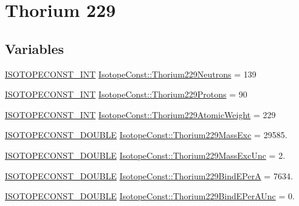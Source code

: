 \hypertarget{group___isotope_const-_thorium-_th229}{}\section{Thorium 229}
\label{group___isotope_const-_thorium-_th229}
\subsection*{Variables}
\begin{DoxyCompactItemize}
\item 
\mbox{\hyperlink{group___isotope_const-_macros_ga5f18360b3e99483a35c32d789e62621c}{I\+S\+O\+T\+O\+P\+E\+C\+O\+N\+S\+T\+\_\+\+I\+NT}} \mbox{\hyperlink{group___isotope_const-_thorium-_th229_ga28608a72c86e6ce0e16561b280726914}{Isotope\+Const\+::\+Thorium229\+Neutrons}} = 139
\item 
\mbox{\hyperlink{group___isotope_const-_macros_ga5f18360b3e99483a35c32d789e62621c}{I\+S\+O\+T\+O\+P\+E\+C\+O\+N\+S\+T\+\_\+\+I\+NT}} \mbox{\hyperlink{group___isotope_const-_thorium-_th229_gaa3caf9fdee3622fb33305113cd5ff133}{Isotope\+Const\+::\+Thorium229\+Protons}} = 90
\item 
\mbox{\hyperlink{group___isotope_const-_macros_ga5f18360b3e99483a35c32d789e62621c}{I\+S\+O\+T\+O\+P\+E\+C\+O\+N\+S\+T\+\_\+\+I\+NT}} \mbox{\hyperlink{group___isotope_const-_thorium-_th229_ga2bcdceeb2dfe6381f6dcc06120c529a5}{Isotope\+Const\+::\+Thorium229\+Atomic\+Weight}} = 229
\item 
\mbox{\hyperlink{group___isotope_const-_macros_ga8f45a7272ce02c0b4c65c44636ed719a}{I\+S\+O\+T\+O\+P\+E\+C\+O\+N\+S\+T\+\_\+\+D\+O\+U\+B\+LE}} \mbox{\hyperlink{group___isotope_const-_thorium-_th229_ga4c36ef6f3262d89bb7a00f3062a3c000}{Isotope\+Const\+::\+Thorium229\+Mass\+Exc}} = 29585.
\item 
\mbox{\hyperlink{group___isotope_const-_macros_ga8f45a7272ce02c0b4c65c44636ed719a}{I\+S\+O\+T\+O\+P\+E\+C\+O\+N\+S\+T\+\_\+\+D\+O\+U\+B\+LE}} \mbox{\hyperlink{group___isotope_const-_thorium-_th229_ga354fbb825054f78143db9fe484f39a56}{Isotope\+Const\+::\+Thorium229\+Mass\+Exc\+Unc}} = 2.
\item 
\mbox{\hyperlink{group___isotope_const-_macros_ga8f45a7272ce02c0b4c65c44636ed719a}{I\+S\+O\+T\+O\+P\+E\+C\+O\+N\+S\+T\+\_\+\+D\+O\+U\+B\+LE}} \mbox{\hyperlink{group___isotope_const-_thorium-_th229_ga026b1c777331f5425ed547412cfe5a6e}{Isotope\+Const\+::\+Thorium229\+Bind\+E\+PerA}} = 7634.
\item 
\mbox{\hyperlink{group___isotope_const-_macros_ga8f45a7272ce02c0b4c65c44636ed719a}{I\+S\+O\+T\+O\+P\+E\+C\+O\+N\+S\+T\+\_\+\+D\+O\+U\+B\+LE}} \mbox{\hyperlink{group___isotope_const-_thorium-_th229_gaa24361ae64763fa971c2ee137a9ccffe}{Isotope\+Const\+::\+Thorium229\+Bind\+E\+Per\+A\+Unc}} = 0.

\end{DoxyCompactItemize}
